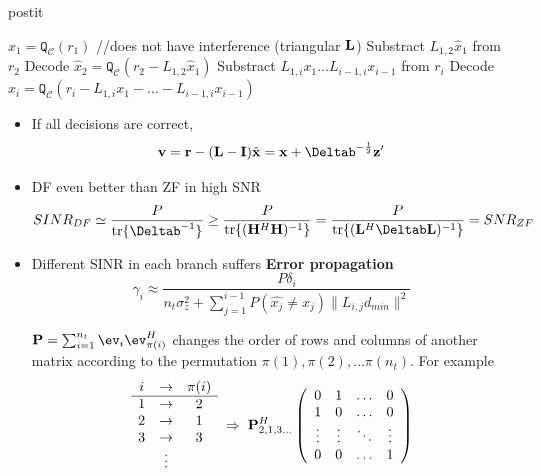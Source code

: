 \documentclass[xcolor=dvipsnames,aspectratio=169]{beamer}
\begin{document}
{        \pagebreak

    \begin{beamercolorbox}[wd=\textwidth]{postit}
     \begin{algorithmic}[0]
        \STATE $\hat{x}_1=\texttt{Q}_{\mathcal{C}}(r_1)$ //does not have interference (triangular $\mathbf{L}$)
        \STATE Substract $L_{1,2}\hat{x}_1$ from $r_2$ 
        \STATE Decode $\hat{x}_2=\texttt{Q}_{\mathcal{C}}(r_2-L_{1,2}\hat{x}_1)$
        \STATE Substract $L_{1,i}x_1\dots L_{i-1,i}x_{i-1}$ from $r_i$
        \STATE Decode $\hat{x}_i=\texttt{Q}_{\mathcal{C}}(r_i-L_{1,i}x_1-\dots - L_{i-1,i}x_{i-1})$
        \ENDFOR
     \end{algorithmic}
     \end{beamercolorbox}
     \begin{itemize}
      \item If all decisions are correct, 
         $$\vv=\rr-(\Lb-\I)\hat{\x}=\x+\Deltab^{-\frac{1}{2}}\z'$$
        \item DF even better than ZF in high SNR
            $$SINR_{DF}\simeq \frac{P}{\tr\{\Deltab^{-1}\}}\geq\frac{P}{\tr\{(\Hb^H\Hb)^{-1}\}}=\frac{P}{\tr\{(\Lb^H\Deltab\Lb)^{-1}\}}=SNR_{ZF}$$
     \end{itemize}

\pagebreak

\begin{itemize}
 \item Different SINR in each branch suffers \textbf{Error propagation}
 $$\gamma_i\approx\frac{P\delta_i}{n_t\sigma_z^2+\sum_{j=1}^{i-1}P(\hat{x_j}\neq x_j)\|L_{i,j}d_{min}\|^2}$$
 \begin{definition}
  $\Pb=\sum_{i=1}^{n_t}\ev_i\ev_{\pi(i)}^H$ changes the order of rows and columns of another matrix according to the permutation $\pi(1),\pi(2),\dots \pi(n_t)$. For example
   $$\begin{array}{ccc}i&\to&\pi(i)\\\hline
      1&\to&2\\
      2&\to&1\\
      3&\to&3\\
      &\vdots&\\
     \end{array}\;\Rightarrow\;
\mathbf{P}_{2,1,3\dots}^H\left(\begin{array}{cccc}
             0 & 1 & \dots & 0\\
             1 & 0 & \dots & 0\\
             \vdots & \vdots & \ddots & \vdots\\
             0 & 0 & \dots & 1\\
            \end{array}\right)$$
 \end{definition}
\end{itemize}

}
\end{document}
